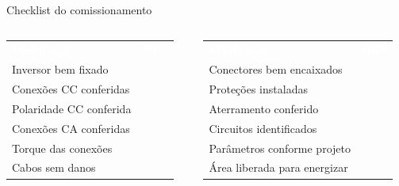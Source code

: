 \documentclass[aspectratio=169,10pt,xcolor=table]{beamer}
\newcommand{\cabecalho}{\rowcolor{azul}}
\newcommand{\tcab}[1]{\textcolor{white}{\bfseries #1}}
\begin{document}
\begin{frame}{Checklist do comissionamento}
  \newcommand{\ok}{\textcolor{verde}{\faSquare[regular]}}
  \begin{columns}[T]
    \begin{column}{0.47\textwidth}
      \small
      \renewcommand{\arraystretch}{1.5}
      \begin{tabular}{L{5cm} c}
        \cabecalho \tcab{Verificação} & \tcab{OK?}\\
        Inversor bem fixado & \ok\\
        Conexões CC conferidas & \ok\\
        Polaridade CC conferida & \ok\\
        Conexões CA conferidas & \ok\\
        Torque das conexões & \ok\\
        Cabos sem danos & \ok\\
      \end{tabular}
    \end{column}
    \begin{column}{0.47\textwidth}
      \small
      \renewcommand{\arraystretch}{1.5}
      \begin{tabular}{L{5cm} c}
        \cabecalho \tcab{Verificação} & \tcab{OK?}\\
        Conectores bem encaixados & \ok\\
        Proteções instaladas & \ok\\
        Aterramento conferido & \ok\\
        Circuitos identificados & \ok\\
        Parâmetros conforme projeto & \ok\\
        Área liberada para energizar & \ok\\
      \end{tabular}
    \end{column}
  \end{columns}
\end{frame}
\end{document}
